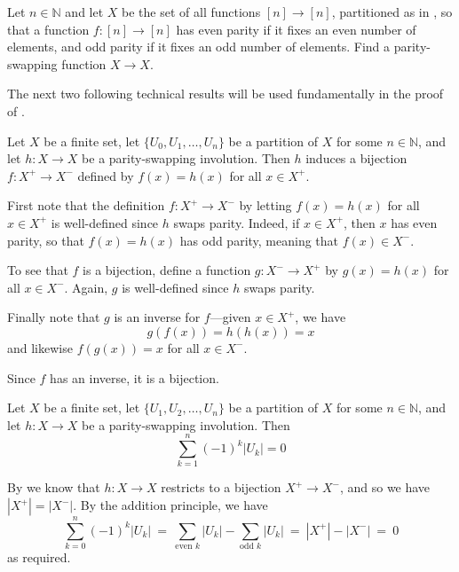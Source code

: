 \begin{exercise}
Let $n \in \mathbb{N}$ and let $X$ be the set of all functions $[n] \to [n]$, partitioned as in , so that a function $f : [n] \to [n]$ has even parity if it fixes an even number of elements, and odd parity if it fixes an odd number of elements. Find a parity-swapping function $X \to X$.
\end{exercise}

The next two following technical results will be used fundamentally in the proof of .

\begin{lemma}
\label{lemParitySwappingInvolutionInducesBijectionFromEvenToOdd}
Let $X$ be a finite set, let $\{ U_0, U_1, \dots, U_n \}$ be a partition of $X$ for some $n \in \mathbb{N}$, and let $h : X \to X$ be a parity-swapping involution. Then $h$ induces a bijection $f : X^+ \to X^-$ defined by $f(x)=h(x)$ for all $x \in X^+$.
\end{lemma}

\begin{cproof}
First note that the definition $f : X^+ \to X^-$ by letting $f(x)=h(x)$ for all $x \in X^+$ is well-defined since $h$ swaps parity. Indeed, if $x \in X^+$, then $x$ has even parity, so that $f(x) = h(x)$ has odd parity, meaning that $f(x) \in X^-$.

To see that $f$ is a bijection, define a function $g : X^- \to X^+$ by $g(x) = h(x)$ for all $x \in X^-$. Again, $g$ is well-defined since $h$ swaps parity.

Finally note that $g$ is an inverse for $f$---given $x \in X^+$, we have
\[ g(f(x)) = h(h(x)) = x \]
and likewise $f(g(x)) = x$ for all $x \in X^-$.

Since $f$ has an inverse, it is a bijection.
\end{cproof}

\begin{lemma}
\label{lemParitySwappingInvolutionGivesZero}
Let $X$ be a finite set, let $\{ U_1, U_2, \dots, U_n \}$ be a partition of $X$ for some $n \in \mathbb{N}$, and let $h : X \to X$ be a parity-swapping involution. Then
\[ \sum_{k=1}^n (-1)^k |U_k| = 0 \]
\end{lemma}

\begin{cproof}
By  we know that $h : X \to X$ restricts to a bijection $X^+ \to X^-$, and so we have $|X^+| = |X^-|$. By the addition principle, we have
\[ \sum_{k=0}^n (-1)^k |U_k| ~=~ \sum_{\text{even } k} |U_k| - \sum_{\text{odd } k} |U_k| ~=~ |X^+| - |X^-| ~=~ 0\]
as required.
\end{cproof}

